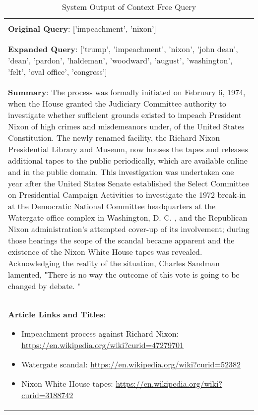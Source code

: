 \begin{table}[h]
    \caption{System Output of Context Free Query}
    \label{tab:free}
    \centering
    \begin{tabular}{ Y } \hline \\
    \textbf{Original Query}: ['impeachment', 'nixon']\Tstrut\Bstrut\\ \\ \hline \\
    \textbf{Expanded Query}: ['trump', 'impeachment', 'nixon', 'john dean', 'dean', 'pardon', 'haldeman', 'woodward', 'august', 'washington', 'felt', 'oval office', 'congress']\Tstrut\Bstrut\\ \\ \hline \\ 
    \textbf{Summary}: The process was formally initiated on February 6, 1974, when the House granted the Judiciary Committee authority to investigate whether sufficient grounds existed to impeach President Nixon of high crimes and misdemeanors  under, of the United States Constitution.  The newly renamed facility, the Richard Nixon Presidential Library and Museum, now houses the tapes and releases additional tapes to the public periodically, which are available online and in the public domain.  This investigation was undertaken one year after the United States Senate established the Select Committee on Presidential Campaign Activities to investigate the 1972 break-in at the Democratic National Committee headquarters at the Watergate office complex in Washington, D. C. , and the Republican Nixon administration's attempted cover-up of its involvement; during those hearings the scope of the scandal became apparent and the existence of the Nixon White House tapes was revealed.  Acknowledging the reality of the situation, Charles Sandman lamented, "There is no way the outcome of this vote is going to be changed by debate. "\Tstrut\Bstrut\\ \\ \hline \\
    \textbf{Article Links and Titles}: \begin{itemize}
        \itemsep0em 
        \item Impeachment process against Richard Nixon: \url{https://en.wikipedia.org/wiki?curid=47279701}
        \item Watergate scandal:  \url{https://en.wikipedia.org/wiki?curid=52382}
        \item Nixon White House tapes:  \url{https://en.wikipedia.org/wiki?curid=3188742}
    \end{itemize}\Tstrut\Bstrut\\\hline
    \end{tabular}
\end{table}

